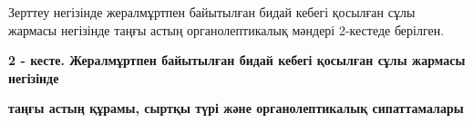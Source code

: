 
Зерттеу негізінде жералмұртпен байытылған бидай кебегі қосылған сұлы
жармасы негізінде таңғы астың органолептикалық мәндері 2-кестеде
берілген.

{\bfseries 2 - кесте. Жералмұртпен байытылған бидай кебегі қосылған сұлы
жармасы негізінде}

{\bfseries таңғы астың құрамы, сыртқы түрі және органолептикалық
сипаттамалары}


